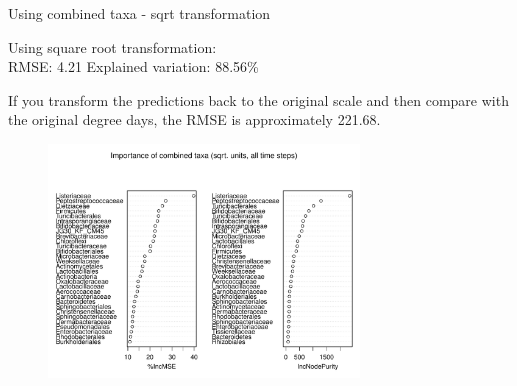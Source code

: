 \documentclass{beamer}
\begin{document}
\begin{frame}{Using combined taxa - sqrt transformation}
  
  {\scriptsize
    
  \noindent Using square root transformation:\\
  RMSE: 4.21  \hspace{0.05in}  Explained variation: 88.56\%

  \vspace{0.05in}
  
  \noindent If you transform the predictions back to the original
  scale and then compare with the original degree days, the RMSE is
  approximately 221.68.
  
\begin{center}
\begin{figure}
  \includegraphics[width=3.25in]{../all_together/all_time_steps/sqrt_units_all_data_combined_imp_plot}
\end{figure}
\end{center}
\vspace{-0.25in}
}
  
\end{frame}
\end{document}

